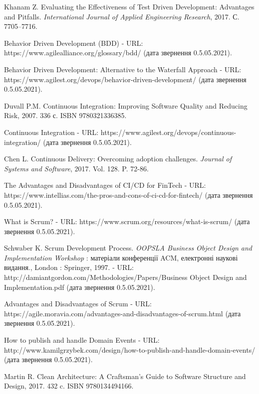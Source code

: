 \begin{thebibliography}{00}
			Khanam Z.
			Evaluating the Effectiveness of Test Driven Development: Advantages and Pitfalls.
      \emph{International Journal of Applied Engineering Research},
      2017. С. 7705–7716.
	
			Behavior Driven Development (BDD) -
			URL: https://www.agilealliance.org/glossary/bdd/
			(дата звернення 0.5.05.2021).

			Behavior Driven Development: Alternative to the Waterfall Approach -
			URL: https://www.agilest.org/devops/behavior-driven-development/
			(дата звернення 0.5.05.2021).
	
			Duvall P.M. 
			Continuous Integration: Improving Software Quality and Reducing Risk,
			2007. 336 с. ISBN 9780321336385.
	
			Continuous Integration -
			URL: https://www.agilest.org/devops/continuous-integration/
			(дата звернення 0.5.05.2021).

      Chen L.
      Continuous Delivery: Overcoming adoption challenges.
      \emph{Journal of Systems and Software},
      2017. Vol. 128. P. 72-86.

      The Advantages and Disadvantages of CI/CD for FinTech -
      URL: https://www.intellias.com/the-pros-and-cons-of-ci-cd-for-fintech/
			(дата звернення 0.5.05.2021).

      What is Scrum? -
      URL: https://www.scrum.org/resources/what-is-scrum/
			(дата звернення 0.5.05.2021).

			Schwaber K.
      Scrum Development Process.
      \emph{OOPSLA Business Object Design and Implementation Workshop} :
      матеріали конференції ACM, електронні наукові видання.,
      London : Springer, 1997.
      - URL: http://damiantgordon.com/Methodologies/Papers/Business Object Design and Implementation.pdf
			(дата звернення 0.5.05.2021).

      Advantages and Disadvantages of Scrum -
      URL: https://agile.moravia.com/advantages-and-disadvantages-of-scrum.html
			(дата звернення 0.5.05.2021).
	
			How to publish and handle Domain Events -
			URL: http://www.kamilgrzybek.com/design/how-to-publish-and-handle-domain-events/
			(дата звернення 0.5.05.2021).

			Martin R.
			Clean Architecture: A Craftsman's Guide to Software Structure and Design,
			2017. 432 c. ISBN 9780134494166.
	

\end{thebibliography}
